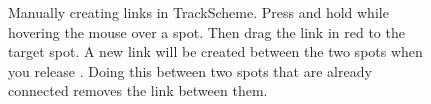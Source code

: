 \begin{figure}
    \centering
    \null\hfill
    \hfill
    \hfill
    \hfill\null
    
    \caption{Manually creating links in TrackScheme. Press and hold  while hovering the mouse over a spot. Then drag the link in red to the target spot. A new link will be created between the two spots when you release . Doing this between two spots that are already connected removes the link between them.}
    \label{fig:TrackSchemeManualLink}
\end{figure}  


